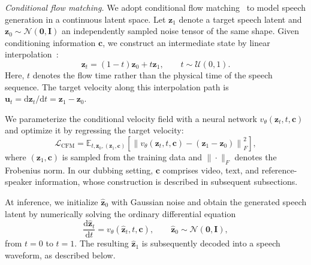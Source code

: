 
\textit{Conditional flow matching.} We adopt conditional flow matching~\cite{lipman2023flow,tong2024improving} to model speech generation in a continuous latent space. Let $\mathbf{z}_1$ denote a target speech latent and $\mathbf{z}_0 \sim \mathcal{N}(\mathbf{0},\mathbf{I})$ an independently sampled noise tensor of the same shape. Given conditioning information $\mathbf{c}$, we construct an intermediate state by linear interpolation~\cite{liu2023flow}:
\begin{equation}
\mathbf{z}_t=(1-t)\mathbf{z}_0+t\mathbf{z}_1,
\qquad t\sim\mathcal{U}(0,1).
\label{eq:flow_path}
\end{equation}
Here, $t$ denotes the flow time rather than the physical time of the speech sequence. The target velocity along this interpolation path is $\mathbf{u}_t=\mathrm{d}\mathbf{z}_t/\mathrm{d}t=\mathbf{z}_1-\mathbf{z}_0$.

We parameterize the conditional velocity field with a neural network $v_\theta(\mathbf{z}_t,t,\mathbf{c})$ and optimize it by regressing the target velocity:
\begin{equation}
\mathcal{L}_{\mathrm{CFM}}
=
\mathbb{E}_{t,\mathbf{z}_0,(\mathbf{z}_1,\mathbf{c})}
\left[
\left\|
v_\theta(\mathbf{z}_t,t,\mathbf{c})
-
(\mathbf{z}_1-\mathbf{z}_0)
\right\|_F^2
\right],
\label{eq:cfm_prelim}
\end{equation}
where $(\mathbf{z}_1,\mathbf{c})$ is sampled from the training data and $\|\cdot\|_F$ denotes the Frobenius norm. In our dubbing setting, $\mathbf{c}$ comprises video, text, and reference-speaker information, whose construction is described in subsequent subsections.

At inference, we initialize $\hat{\mathbf{z}}_0$ with Gaussian noise and obtain the generated speech latent by numerically solving the ordinary differential equation
\begin{equation}
\frac{\mathrm{d}\hat{\mathbf{z}}_t}{\mathrm{d}t}
=
v_\theta(\hat{\mathbf{z}}_t,t,\mathbf{c}),
\qquad
\hat{\mathbf{z}}_0\sim\mathcal{N}(\mathbf{0},\mathbf{I}),
\label{eq:flow_ode}
\end{equation}
from $t=0$ to $t=1$. The resulting $\hat{\mathbf{z}}_1$ is subsequently decoded into a speech waveform, as described below.
